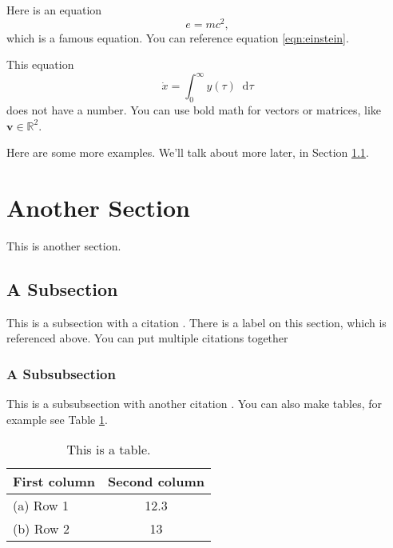 \documentclass[letterpaper,fleqn,oneside]{qu-handout}
\newcommand{\Real}{\mathbb R}
\newcommand{\mbf}{\mathbf}
\newcommand*\dif{\mathop{}\!\mathrm{d}}
\begin{document}
Here is an equation
\begin{equation}
  \label{eqn:einstein}
  e = mc^2,
\end{equation}
which is a famous equation.  You can reference equation \eqref{eqn:einstein}.

This equation
\begin{equation*}
  \dot{x} = \int_{0}^\infty y(\tau)\dif\tau
\end{equation*}
does not have a number.  You can use bold math for vectors or matrices, like $\mbf{v}\in\Real^2$.

Here are some more examples.  We'll talk about more later, in Section \ref{sec:special}.

\section{Another Section}

This is another section.

\subsection{A Subsection}
\label{sec:special}

This is a subsection with a citation \cite{Ogata:2001aa}.  There is a label on this section, which is referenced above.  You can put multiple citations together \cite{Marshall:2004aa,Ogata:2001aa}

\subsubsection{A Subsubsection}

This is a subsubsection with another citation \cite[p.\ 1964]{Marshall:2004aa}.  You can also make tables, for example see Table \ref{tbl:example}.

\begin{table}
  \caption{This is a table.}
  \begin{center}
    \begin{tabular}{lc}
      \toprule
      \bf First column & \bf Second column \\ \midrule
      (a) Row 1 & 12.3 \\
      (b) Row 2 & 13 \\
      \bottomrule
    \end{tabular}
  \end{center}
  \label{tbl:example}
\end{table}%
\end{document}
